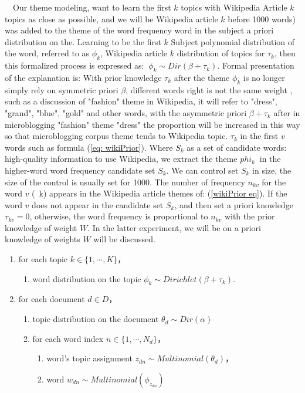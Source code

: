 \documentclass{sig-alternate-05-2015}
\begin{document}
\ \ Our theme modeling, want to learn the first \(k\) topics with Wikipedia Article \(k\) topics as close as possible, and we will be Wikipedia article \(k\) before 1000 words) was added to the theme of the word frequency word in the subject a priori distribution on the.
Learning to be the first \(k\) Subject polynomial distribution of the word, referred to as \(\phi_k \), Wikipedia article \(k \) distribution of topics for \(\tau_k \), then this formalized process is expressed as: \(\ \phi_k \sim Dir(\beta + \tau_k) \).
Formal presentation of the explanation is: With prior knowledge \(\tau_k \) after the theme \(\phi_k \) is no longer simply rely on symmetric priori \(\beta \), different words right is not the same weight , such as a discussion of "fashion" theme in Wikipedia, it will refer to "dress", "grand", "blue", "gold" and other words, with the asymmetric priori \(\beta + \tau_k \) after in microblogging "fashion" theme "dress" the proportion will be increased in this way so that microblogging corpus theme tends to Wikipedia topic.
\(\tau_k \) in the first \(v \) words such as formula (\ref{eq: wikiPrior}).
Where \(S_k \) as a set of candidate words: high-quality information to use Wikipedia, we extract the theme \(phi_k \ \) in the higher-word word frequency candidate set \(S_k \).
We can control set \(S_k \) in size, the size of the control is usually set for 1000.
The number of frequency \(n_{kv} \) for the word \(v \) (\ k) appears in the Wikipedia article themes of: (\ref{wikiPrior eq}).
If the word \(v \) does not appear in the candidate set \(S_k \), and then set a priori knowledge \(\tau_{kv} = 0 \), otherwise, the word frequency is proportional to \(n_{kv} \) with the prior knowledge of weight \(W\).
In the latter experiment, we will be on a priori knowledge of weights \(W \) will be discussed.

\begin{enumerate}[noitemsep]
    \item for each topic \(k \in \{1,\cdots,K\}\)，
    \begin{enumerate}
        \item word distribution on the topic \(\phi_k \sim Dirichlet(\beta+\tau_k)\).
    \end{enumerate}
    \item for each document \(d \in D\)，
    \begin{enumerate}
        \item topic distribution on the document \(\theta_d \sim Dir(\alpha)\)
        \item for each word index \(n \in \{1,\cdots,N_d\}\)，
        \begin{enumerate}
            \item word's topic assignment \(z_{dn} \sim Multinomial(\theta_d)\)，
            \item word \(w_{dn} \sim Multinomial(\phi_{z_{dn}})\)
        \end{enumerate}
    \end{enumerate}
\end{enumerate}
\end{document}
